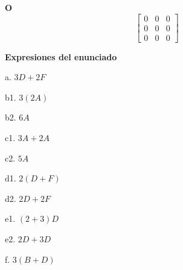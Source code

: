 \documentclass[11pt,a4paper,landscape]{article}
\begin{document}
\par\smallskip \begin{minipage}[t]{.47\linewidth}\centering \textbf{O}\[\begin{bmatrix}0 & 0 & 0\\0 & 0 & 0\\0 & 0 & 0\end{bmatrix}\]\end{minipage}\par\smallskip
\textbf{Expresiones del enunciado}\par
a. \(3D+2F\)\par
b1. \(3(2A)\)\par
b2. \(6A\)\par
c1. \(3A+2A\)\par
c2. \(5A\)\par
d1. \(2(D+F)\)\par
d2. \(2D+2F\)\par
e1. \((2+3)D\)\par
e2. \(2D+3D\)\par
f. \(3(B+D)\)\par
\end{document}
